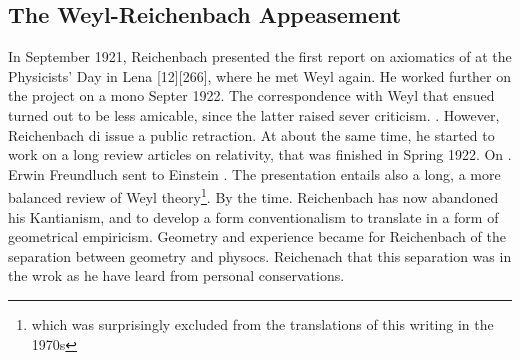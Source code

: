 \documentclass[draft]{article}
\begin{document}

\subsection{The Weyl-Reichenbach Appeasement}

  

In September 1921, Reichenbach presented the first report on axiomatics of \sr at the Physicists' Day in Lena [12][266], where he met Weyl again. He worked further on the project on a mono Septer 1922. The correspondence with Weyl that ensued turned out to be less amicable, since the latter raised sever criticism. .  However, Reichenbach di issue a public retraction. At about the same time, he started to work on a long review articles on relativity, that was finished in Spring 1922. On . Erwin Freundluch sent to Einstein . The presentation entails also a long, a more balanced review of Weyl theory\footnote{which was surprisingly excluded from the translations of this writing in the 1970s}. By the time. Reichenbach has now abandoned his Kantianism, and to develop a form conventionalism to translate in a form of geometrical empiricism.  Geometry and experience became for Reichenbach of the separation between geometry and physocs. Reichenach that this separation was in the wrok as he have leard from personal conservations.
\end{document}
